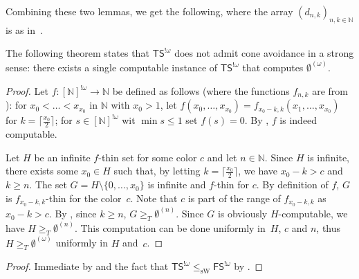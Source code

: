 \documentclass{article}
\newcommand{\FS}[0]{\mathsf{FS}}
\newcommand{\TS}[0]{\mathsf{TS}}
\newcommand{\NN}[0]{\mathbb{N}}
\newcommand{\sW}{\mathrm{sW}}
\newtheorem{theorem}{Theorem}
\numberwithin{theorem}{section}
\newtheorem{lemma}[theorem]{Lemma}
\newtheorem{corollary}[theorem]{Corollary}
\newcommand{\ludovic}[1]{\textcolor{blue}{#1}}
\begin{document}
Combining these two lemmas, we get the following, where the array $(d_{n,k})_{n,k\in\NN}$ is as in~.


The following theorem states that $\TS^{!\omega}$ does not admit cone avoidance in a strong sense: there exists a single computable instance of $\TS^{!\omega}$ that computes $\emptyset^{(\omega)}$.


\begin{proof}
Let $f : [\NN]^{!\omega} \to \NN$ be defined as follows (where the functions $f_{n,k}$ are from ): for $x_0 < \dots < x_{x_0}$ in $\NN$ with $x_0 > 1$, let $f(x_0, \dots, x_{x_0})= f_{x_0 - k, k}(x_1, \dots, x_{x_0})$ for $k = \lceil \frac{x_0}{2} \rceil$; for $s \in [\NN]^{!\omega}$ wit $\min s \leq 1$ set $f(s) = 0$. By , $f$ is indeed computable.

Let $H$ be an infinite $f$-thin set for some color $c$ and let $n \in \NN$. Since $H$ is infinite, there exists some $x_0 \in H$ such that, by letting $k = \lceil \frac{x_0}{2} \rceil$, we have $x_0 - k > c$ and $k \geq n$. The set $G = H \setminus \{0, \dots, x_0\}$ is infinite and $f$-thin for $c$. By definition of $f$, $G$ is $f_{x_0 - k, k}$-thin for the color~$c$. Note that $c$ is part of the range of $f_{x_0 - k, k}$ as $x_0 - k > c$. By , since $k \geq n$, $G \geq_T \emptyset^{(n)}$. Since $G$ is obviously $H$-computable, we have $H\geq_T \emptyset^{(n)}$.
This computation can be done uniformly in~$H$, $c$ and $n$, thus $H \geq_T \emptyset^{(\omega)}$ uniformly in $H$ and~$c$.
\end{proof}

\begin{proof}
Immediate by  and the fact that $\TS^{!\omega} \leq_{\sW} \FS^{!\omega}$ by .
\end{proof}
\end{document}
